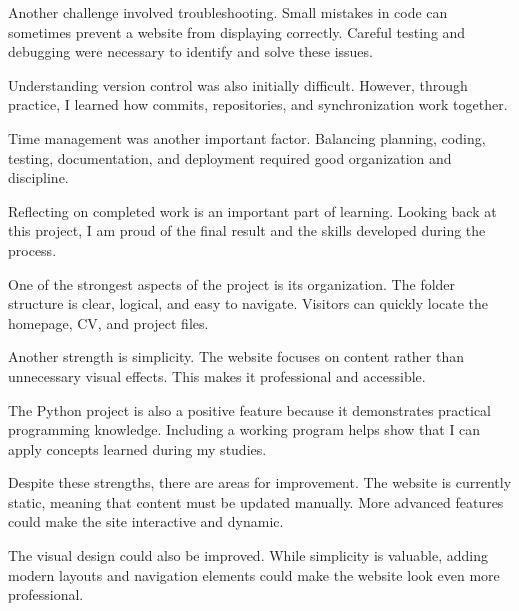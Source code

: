 \documentclass[12pt]{article}
\begin{document}
Another challenge involved troubleshooting. Small mistakes in code can sometimes prevent a website from displaying correctly. Careful testing and debugging were necessary to identify and solve these issues.

Understanding version control was also initially difficult. However, through practice, I learned how commits, repositories, and synchronization work together.

Time management was another important factor. Balancing planning, coding, testing, documentation, and deployment required good organization and discipline.

Reflecting on completed work is an important part of learning. Looking back at this project, I am proud of the final result and the skills developed during the process.

One of the strongest aspects of the project is its organization. The folder structure is clear, logical, and easy to navigate. Visitors can quickly locate the homepage, CV, and project files.

Another strength is simplicity. The website focuses on content rather than unnecessary visual effects. This makes it professional and accessible.

The Python project is also a positive feature because it demonstrates practical programming knowledge. Including a working program helps show that I can apply concepts learned during my studies.

Despite these strengths, there are areas for improvement. The website is currently static, meaning that content must be updated manually. More advanced features could make the site interactive and dynamic.

The visual design could also be improved. While simplicity is valuable, adding modern layouts and navigation elements could make the website look even more professional.
\end{document}
